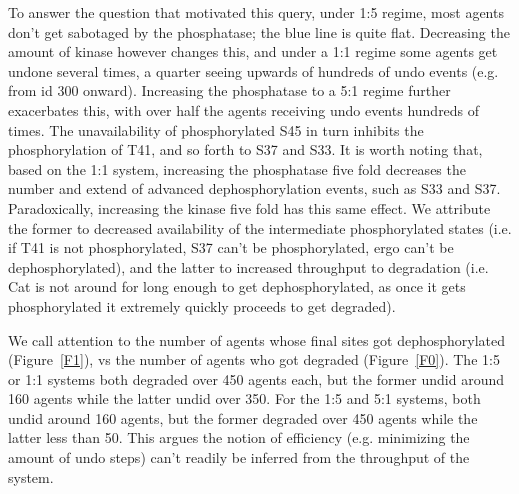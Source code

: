 To answer the question that motivated this query, under 1:5 regime,
most agents don’t get sabotaged by the phosphatase; the blue line is
quite flat. Decreasing the amount of kinase however changes this, and
under a 1:1 regime some agents get undone several times, a quarter
seeing upwards of hundreds of undo events (e.g. from id 300
onward). Increasing the phosphatase to a 5:1 regime further
exacerbates this, with over half the agents receiving undo events
hundreds of times. The unavailability of phosphorylated S45 in turn
inhibits the phosphorylation of T41, and so forth to S37 and S33. It
is worth noting that, based on the 1:1 system, increasing the
phosphatase five fold decreases the number and extend of advanced
dephosphorylation events, such as S33 and S37. Paradoxically,
increasing the kinase five fold has this same effect. We attribute the
former to decreased availability of the intermediate phosphorylated
states (i.e. if T41 is not phosphorylated, S37 can’t be
phosphorylated, ergo can’t be dephosphorylated), and the latter to
increased throughput to degradation (i.e. Cat is not around for long
enough to get dephosphorylated, as once it gets phosphorylated it
extremely quickly proceeds to get degraded).

We call attention to the number of agents whose final sites got
dephosphorylated (Figure~\ref{F1}), vs the number of agents who got
degraded (Figure~\ref{F0}). The 1:5 or 1:1 systems both degraded over
450 agents each, but the former undid around 160 agents while the
latter undid over 350. For the 1:5 and 5:1 systems, both undid around
160 agents, but the former degraded over 450 agents while the latter
less than 50. This argues the notion of efficiency (e.g. minimizing
the amount of undo steps) can’t readily be inferred from the
throughput of the system.


